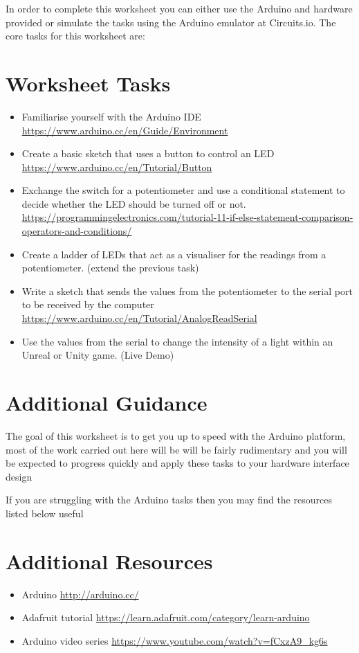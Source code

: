\documentclass{../../../fal_assignment}
\begin{document}
In order to complete this worksheet you can either use the Arduino and hardware provided or simulate the tasks using the Arduino emulator at Circuits.io. The core tasks for this worksheet are:

\section*{Worksheet Tasks}
\begin{itemize}
	\item Familiarise yourself with the Arduino IDE \url{https://www.arduino.cc/en/Guide/Environment}
	\item Create a basic sketch that uses a button to control an LED \url{https://www.arduino.cc/en/Tutorial/Button}
	\item Exchange the switch for a potentiometer and use a conditional statement to decide whether the LED should be turned off or not. \url{https://programmingelectronics.com/tutorial-11-if-else-statement-comparison-operators-and-conditions/}
	\item Create a ladder of LEDs that act as a visualiser for the readings from a potentiometer. (extend the previous task)
	\item Write a sketch that sends the values from the potentiometer to the serial port to be received by the computer \url{https://www.arduino.cc/en/Tutorial/AnalogReadSerial}
	\item Use the values from the serial to change the intensity of a light within an Unreal or Unity game. (Live Demo)
\end{itemize}


\section*{Additional Guidance}

The goal of this worksheet is to get you up to speed with the Arduino platform, most of the work carried out here will be will be fairly rudimentary and you will be expected to progress quickly and apply these tasks to your hardware interface design

If you are struggling with the Arduino tasks then you may find the resources listed below useful

\section*{Additional Resources}

\begin{itemize}
    \item Arduino \url{http://arduino.cc/}
    \item Adafruit tutorial \url{https://learn.adafruit.com/category/learn-arduino}
    \item Arduino video series \url{https://www.youtube.com/watch?v=fCxzA9_kg6s}
\end{itemize}
\end{document}
